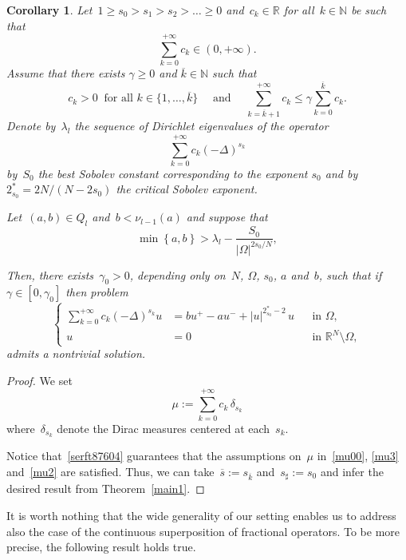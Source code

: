\documentclass[12pt,a4paper,intlimits,sumlimits]{amsart}
\def \N {\mathbb{N}}
\def \R {\mathbb{R}}
\newcommand{\set}[1]{\left\{#1\right\}}
\theoremstyle{definition}
\theoremstyle{plain}
\newtheorem{corollary}[definition]{Corollary}
\numberwithin{equation}{section}
\renewcommand{\le}{\leqslant}
\renewcommand{\ge}{\geqslant}
\begin{document}
\begin{corollary}\label{serie2}
Let~$1\ge s_0 > s_1> s_2 >\dots \ge 0$ and~$c_k\in\R$ for all~$k\in\N$ be such that
$$ \sum_{k=0}^{+\infty} c_k \in (0, +\infty).$$
Assume that there exists $\gamma\ge0$ and $\overline k\in\N$ such that 
\begin{equation}\label{serft87604}
c_k>0\ \text{ for all } k\in\{1,\dots, \overline k\}\quad \text{ and }\quad \sum_{k=\overline k +1}^{+\infty} c_k \le \gamma \sum_{k=0}^{\overline k} c_k.
\end{equation}
Denote by~$\lambda_l$ the sequence of Dirichlet eigenvalues of the operator
\[
\sum_{k=0}^{+\infty} c_k (-\Delta)^{s_k} 
\]
by~$S_0$ the best Sobolev constant corresponding to the exponent $s_0$ and
by~$2_{s_0}^* = 2N/(N-2s_0)$ the critical Sobolev exponent. 

Let~$(a, b)\in Q_l$ and~$b <\nu_{l-1}(a)$ and suppose that
\begin{equation*}
\min \set{a,b} > \lambda_l -\frac{S_0}{|\Omega|^{2s_0/N}},
\end{equation*}

Then, there exists~$\gamma_0>0$, depending only on~$N$, $\Omega$, $s_0$, $a$ and~$b$, such that if~$\gamma\in[0,\gamma_0]$
then problem \begin{equation*}
\left\{\begin{aligned}
\sum_{k=0}^{+\infty} c_k (-\Delta)^{s_k} u & = bu^+ - au^- + |u|^{2_{s_0}^* - 2}\, u && \text{in } \Omega,\\
u & = 0 && \text{in } \R^N \setminus \Omega,
\end{aligned}\right.
\end{equation*}
admits a nontrivial solution.\end{corollary}

\begin{proof}
We set
\[
\mu:=\sum_{k=0}^{+\infty} c_k \,\delta_{s_k}
\]
where~$\delta_{s_k}$ denote the Dirac measures centered at each~$s_k$. 

Notice that~\eqref{serft87604} guarantees that
the assumptions on~$\mu$ in~\eqref{mu00},
\eqref{mu3} and~\eqref{mu2} are satisfied.
Thus, we can take~$\overline s:=s_{\overline k}$ and~$s_\sharp:=s_0$ and infer the desired result from
Theorem~\ref{main1}.
\end{proof}

It is worth nothing that the wide generality of our setting enables us to address also the case of the continuous superposition of fractional operators. To be more precise, the following result holds true.
\end{document}
